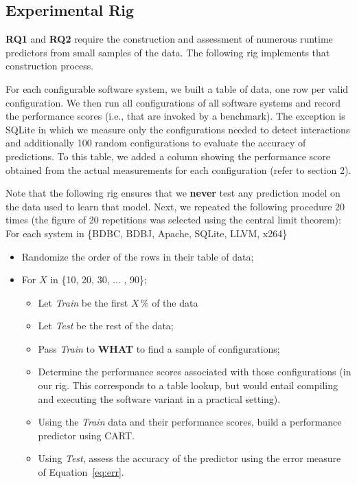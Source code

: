 \documentclass{newsig}
\newcommand{\bi}{\begin{itemize}}%
\newcommand{\ei}{\end{itemize}}
\newcommand{\eq}[1]{Equation~\ref{eq:#1}}
\newcommand{\what}{{\bf WHAT }}
\begin{document}
\subsection{Experimental Rig}


{\bf RQ1} and {\bf RQ2} require the construction and assessment of numerous runtime predictors from small samples
of the data. The following rig implements that construction process.

For each configurable software system, we built a table of data, one row per valid configuration. We then run all configurations of all software systems
and record the performance scores (i.e., that are invoked by a benchmark).
The exception is SQLite in which we measure only the
configurations needed to detect interactions and additionally
100 random configurations to evaluate the accuracy of
predictions.  
To this table, we added a column showing the performance score obtained from the actual measurements for each configuration (refer to section 2).

Note that the following rig ensures that
we \textbf{never} test any prediction model on the data used to learn that model. Next, we repeated the following procedure 20 times (the figure of 20 repetitions was
selected using the central limit theorem): 
For each system in \{BDBC, BDBJ, Apache, SQLite, LLVM, x264\}
\bi
\item Randomize the order of the rows in their table of data;
\item For $X$ in \{10, 20, 30, ... , 90\};
\bi
\item Let {\em Train} be the first $X$\,\% of the data 
\item Let {\em Test} be the rest of the data;
\item Pass {\em Train} to \what to find a sample of configurations;
\item Determine the performance scores associated with those configurations (in our rig. This corresponds to a table lookup, but would entail compiling and executing the software variant in a practical setting).
\item Using the {\em Train}  data and their performance scores, build a performance predictor using CART.
\item Using {\em Test}, assess the accuracy of the predictor using the error 
measure of \eq{err}.
\ei
\ei
\end{document}
